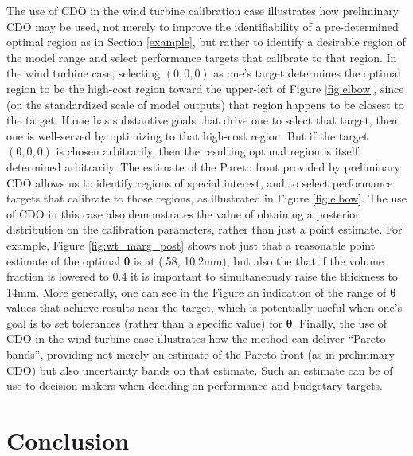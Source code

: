\documentclass[12pt]{article}
\begin{document}
The use of CDO in the wind turbine calibration case illustrates how preliminary CDO may be used, not merely to improve the identifiability of a pre-determined optimal region as in Section \ref{example}, but rather to identify a desirable region of the model range and select performance targets that calibrate to that region.
%
In the wind turbine case, selecting $(0,0,0)$ as one's target determines the optimal region to be the high-cost region toward the upper-left of Figure \ref{fig:elbow}, since (on the standardized scale of model outputs) that region happens to be closest to the target.
%
If one has substantive goals that drive one to select that target, then one is well-served by optimizing to that high-cost region.
%
But if the target $(0,0,0)$ is chosen arbitrarily, then the resulting optimal region is itself determined arbitrarily.
%
The estimate of the Pareto front provided by preliminary CDO allows us to identify regions of special interest, and to select performance targets that calibrate to those regions, as illustrated in Figure \ref{fig:elbow}.
%
The use of CDO in this case also demonstrates the value of obtaining a posterior distribution on the calibration parameters, rather than just a point estimate.
%
For example, Figure \ref{fig:wt_marg_post} shows not just that a reasonable point estimate of the optimal $\boldsymbol\theta$ is at (.58, 10.2mm), but also the that if the volume fraction is lowered to 0.4 it is important to simultaneously raise the thickness to 14mm.
%
More generally, one can see in the Figure an indication of the range of $\boldsymbol\theta$ values that achieve results near the target, which is potentially useful when one's goal is to set tolerances (rather than a specific value) for $\boldsymbol\theta$.
%
Finally, the use of CDO in the wind turbine case illustrates how the method can deliver ``Pareto bands'', providing not merely an estimate of the Pareto front (as in preliminary CDO) but also uncertainty bands on that estimate.
%
Such an estimate can be of use to decision-makers when deciding on performance and budgetary targets.




\section{Conclusion} \label{conclusion}
\end{document}
